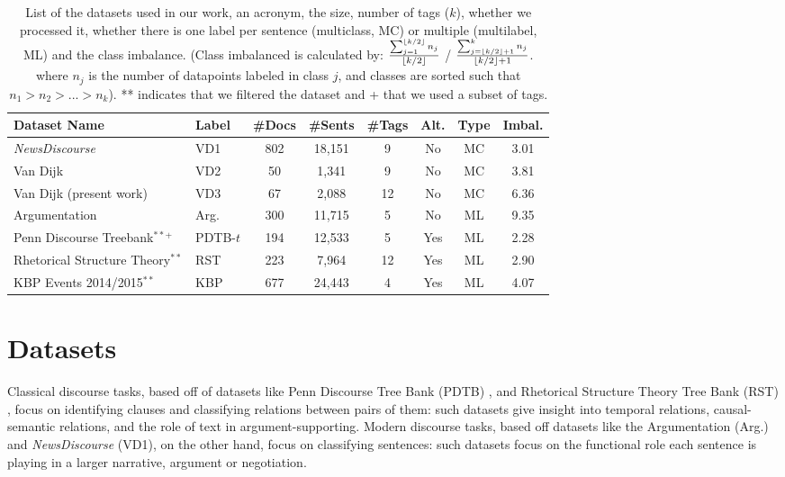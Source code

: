 \documentclass[11pt]{article}
\newcommand\nd{VD1\xspace}
\newcommand\fin{VD2\xspace}
\newcommand\spangh{VD3\xspace}
\newcommand\argumentation{Arg.\xspace}
\DeclarePairedDelimiter\floor{\lfloor}{\rfloor}
\begin{document}
\begin{table*}[t]
    \centering
    \begin{tabular}{|l|l|c|c|c|c|c|c|}
         \hline
         Dataset Name & Label & \#Docs & \#Sents & \#Tags & Alt. & Type & Imbal.\\
         \hline          
         \textit{NewsDiscourse} & \nd & 802 & 18,151 & 9 & No & MC & 3.01 \\
         Van Dijk \cite{yarlott2018identifying} & \fin & 50 & 1,341 & 9 & No & MC & 3.81 \\
         Van Dijk (present work) & \spangh & 67 & 2,088 & 12 & No & MC & 6.36 \\
         \hline
         Argumentation & \argumentation & 300 & 11,715 & 5 &  No & ML & 9.35 \\
         \hline
         Penn Discourse Treebank$^{**+}$ & PDTB-$t$ & 194 & 12,533 & 5 &  Yes & ML & 2.28 \\
         Rhetorical Structure Theory$^{**}$ & RST & 223 & 7,964 & 12 & Yes & ML & 2.90 \\
         KBP Events 2014/2015$^{**}$ & KBP & 677 & 24,443 & 4 & Yes & ML & 4.07 \\
         \hline
    \end{tabular}
    \caption{List of the datasets used in our work, an acronym, the size, number of tags ($k$), whether we processed it, whether there is one label per sentence (multiclass, MC) or multiple (multilabel, ML) and the class imbalance. 
    (Class imbalanced is calculated by: $\frac{\sum_{j=1}^{\floor*{k/2}} n_j}{\floor{k/2}}$ / $\frac{\sum_{j=\floor*{k/2} + 1}^{k} n_j} {\floor{k/2} + 1}$.
where $n_j$ is the number of datapoints labeled in class $j$, and classes are sorted such that $n_1 > n_2 > ... > n_k$). ** indicates that we filtered the dataset and + that we used a subset of tags.
    }
    \label{tab:datasets_used}
\end{table*}

\section{Datasets}
\label{sct:datasets}
Classical discourse tasks, based off of datasets like Penn Discourse Tree Bank (PDTB) \cite{prasad2008penn}, and Rhetorical Structure Theory Tree Bank (RST) \cite{carlson2003building}, focus on identifying clauses and classifying relations between pairs of them: such datasets give insight into temporal relations, causal-semantic relations, and the role of text in argument-supporting. Modern discourse tasks, based off datasets like the Argumentation (\argumentation) \cite{al2016news} and \textit{NewsDiscourse} (\nd), on the other hand, focus on classifying sentences: such datasets focus on the functional role each sentence is playing in a larger narrative, argument or negotiation.
\end{document}
